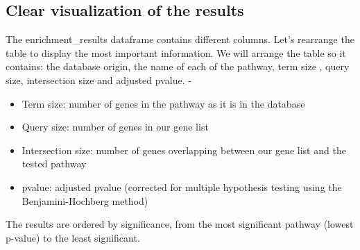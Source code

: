 \documentclass[
]{book}
\newenvironment{Shaded}{\begin{snugshade}}{\end{snugshade}}
\newcommand{\AttributeTok}[1]{\textcolor[rgb]{0.13,0.29,0.53}{#1}}
\newcommand{\DecValTok}[1]{\textcolor[rgb]{0.00,0.00,0.81}{#1}}
\newcommand{\FunctionTok}[1]{\textcolor[rgb]{0.13,0.29,0.53}{\textbf{#1}}}
\newcommand{\NormalTok}[1]{#1}
\newcommand{\OtherTok}[1]{\textcolor[rgb]{0.56,0.35,0.01}{#1}}
\newcommand{\SpecialCharTok}[1]{\textcolor[rgb]{0.81,0.36,0.00}{\textbf{#1}}}
\newcommand{\StringTok}[1]{\textcolor[rgb]{0.31,0.60,0.02}{#1}}
\providecommand{\tightlist}{%
  \setlength{\itemsep}{0pt}\setlength{\parskip}{0pt}}
\begin{document}
\subsection{Clear visualization of the results}\label{clear-visualization-of-the-results}

The enrichment\_results dataframe contains different columns. Let's rearrange the table to display the most important information. We will arrange the table so it contains: the database origin, the name of each of the pathway, term size , query size, intersection size and adjusted pvalue. -

\begin{itemize}
\tightlist
\item
  Term size: number of genes in the pathway as it is in the database
\item
  Query size: number of genes in our gene list
\item
  Intersection size: number of genes overlapping between our gene list and the tested pathway
\item
  pvalue: adjusted pvalue (corrected for multiple hypothesis testing using the Benjamini-Hochberg method)
\end{itemize}

The results are ordered by significance, from the most significant pathway (lowest p-value) to the least significant.

\begin{Shaded}
\end{Shaded}
\end{document}
